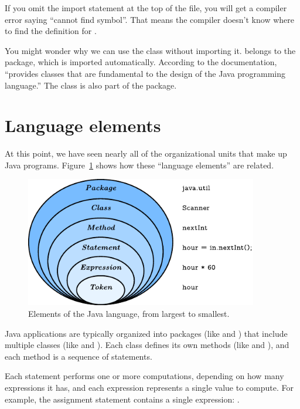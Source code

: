 If you omit the import statement at the top of the file, you will get a compiler error saying ``cannot find symbol''.
That means the compiler doesn't know where to find the definition for .

You might wonder why we can use the  class without importing it.
 belongs to the  package, which is imported automatically.
According to the documentation,  ``provides classes that are fundamental to the design of the Java programming language.''
The  class is also part of the  package.


\section{Language elements}


At this point, we have seen nearly all of the organizational units that make up Java programs.
Figure~\ref{fig.package} shows how these ``language elements'' are related.

\begin{figure}[!ht]
\begin{center}
\includegraphics[width=4in]{figs/package.pdf}
\caption{Elements of the Java language, from largest to smallest.}
\label{fig.package}
\end{center}
\end{figure}


Java applications are typically organized into packages (like  and ) that include multiple classes (like  and ).
Each class defines its own methods (like  and ), and each method is a sequence of statements.

Each statement performs one or more computations, depending on how many expressions it has, and each expression represents a single value to compute.
For example, the assignment statement  contains a single expression: .

